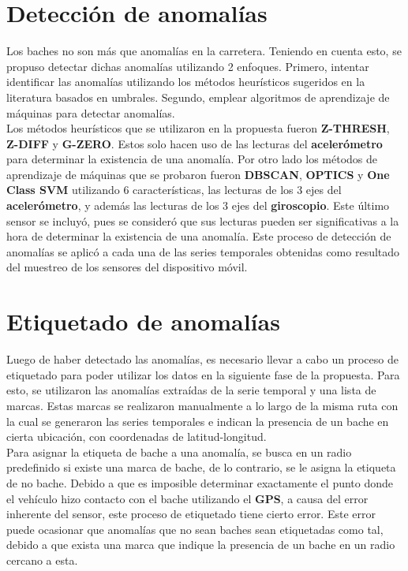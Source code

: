 \section{Detección de anomalías}
	Los baches no son más que anomalías en la carretera. Teniendo en cuenta esto, se propuso detectar dichas anomalías utilizando
	2 enfoques. Primero, intentar identificar las anomalías utilizando los métodos heurísticos sugeridos en la literatura basados
	en umbrales. Segundo, emplear algoritmos de aprendizaje de máquinas para detectar anomalías.\\
	\indent Los métodos heurísticos que se utilizaron en la propuesta fueron \textbf{Z-THRESH}, \textbf{Z-DIFF} y \textbf{G-ZERO}.
	Estos solo hacen uso de las lecturas del \textbf{acelerómetro} para determinar la existencia de una anomalía. Por otro lado los
	métodos de aprendizaje de máquinas que se probaron fueron \textbf{DBSCAN}, \textbf{OPTICS} y \textbf{One Class SVM} utilizando 
	6 características, las lecturas de los 3 ejes del \textbf{acelerómetro}, y además las lecturas de los 3 ejes del \textbf{giroscopio}.
	Este último sensor se incluyó, pues se consideró que sus lecturas pueden ser significativas a la hora de determinar la existencia de una 
	anomalía. Este proceso de detección de anomalías se aplicó a cada una de las series temporales obtenidas como resultado del muestreo
	de los sensores del dispositivo móvil.

\section{Etiquetado de anomalías}
	Luego de haber detectado las anomalías, es necesario llevar a cabo un proceso de etiquetado para poder utilizar los datos en la siguiente
	fase de la propuesta. Para esto, se utilizaron las anomalías extraídas de la serie temporal y una lista de marcas. Estas marcas se realizaron
	manualmente a lo largo de la misma ruta con la cual se generaron las series temporales e indican la presencia de un bache en cierta
	ubicación, con coordenadas de latitud-longitud.\\
	\indent Para asignar la etiqueta de bache a una anomalía, se busca en un radio predefinido si existe una marca de bache, de lo contrario, se le
	asigna la etiqueta de no bache. Debido a que es imposible determinar exactamente el punto donde el vehículo hizo contacto con el bache
	utilizando el \textbf{GPS}, a causa del error inherente del sensor, este proceso de etiquetado tiene cierto error. Este error puede ocasionar
	que anomalías que no sean baches sean etiquetadas como tal, debido a que exista una marca que indique la presencia de un bache en un radio
	cercano a esta.

